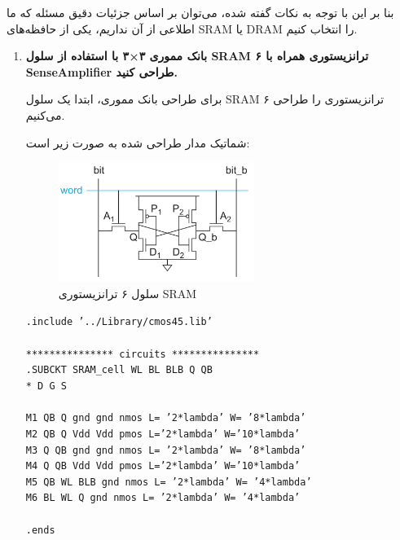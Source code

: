 \documentclass[12pt]{exam}
\begin{document}
\begin{questions}
بنا بر این با توجه به نکات گفته شده، می‌توان بر اساس جزئیات دقیق مسئله که ما اطلاعی از آن نداریم، یکی از حافظه‌های SRAM یا DRAM را انتخاب کنیم.
	
	
	\question
	\begin{enumerate}
		\item \textbf{بانک مموری ۳×۳ با استفاده از سلول SRAM ۶ ترانزیستوری همراه با SenseAmplifier طراحی کنید.}
		
		
		
		برای طراحی بانک مموری، ابتدا یک سلول SRAM ۶ ترانزیستوری را طراحی می‌کنیم.
		
		شماتیک مدار طراحی شده به صورت زیر است:
		
		\begin{figure}[h]
			\centering
			\includegraphics[width=0.6\textwidth]{images/img1}
			\caption{سلول ۶ ترانزیستوری SRAM}
			\label{سلول ۶ ترانزیستوری SRAM}
		\end{figure}
		
		
		
\begin{latin}
	\texttt{.include '../Library/cmos45.lib'}\\\\
	\texttt{*************** circuits ***************}\\
	\texttt{.SUBCKT SRAM\_cell WL BL BLB Q QB}\\
	\texttt{* D G S}\\\\
	\texttt{M1 QB Q gnd gnd nmos L= '2*lambda' W= '8*lambda'}\\
	\texttt{M2 QB Q Vdd Vdd pmos L='2*lambda' W='10*lambda'}\\
	\texttt{M3 Q QB gnd gnd nmos L= '2*lambda' W= '8*lambda'}\\
	\texttt{M4 Q QB Vdd Vdd pmos L='2*lambda' W='10*lambda'}\\
	\texttt{M5 QB WL BLB gnd nmos L= '2*lambda' W= '4*lambda'}\\
	\texttt{M6 BL WL Q gnd nmos L= '2*lambda' W= '4*lambda'}\\\\
	\texttt{.ends}\\
\end{latin}



\end{enumerate}
\end{questions}
\end{document}
